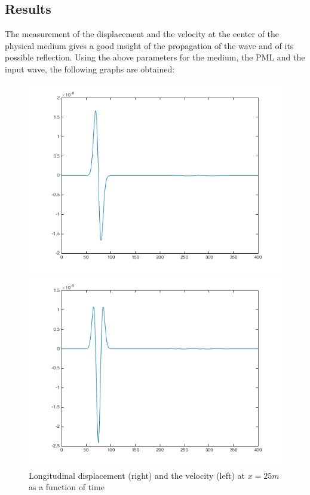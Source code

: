 \subsection{Results}
The measurement of the displacement and the velocity at the center of the physical medium gives a good insight of the propagation of the wave and of its possible reflection. Using the above parameters for the medium, the PML and the input wave, the following graphs are obtained:
\begin{figure}[H]
\centering
\begin{minipage}{.5\textwidth}
  \centering
  \includegraphics[width=.9\linewidth]{images/disp_med.png}
\end{minipage}%
\begin{minipage}{.5\textwidth}
  \centering
  \includegraphics[width=.9\linewidth]{images/vel_med.png}
\end{minipage}
\caption{Longitudinal displacement (right) and the velocity (left) at $x=25m$ as a function of time}
\label{fig:disp_vel_improved}
\end{figure}

